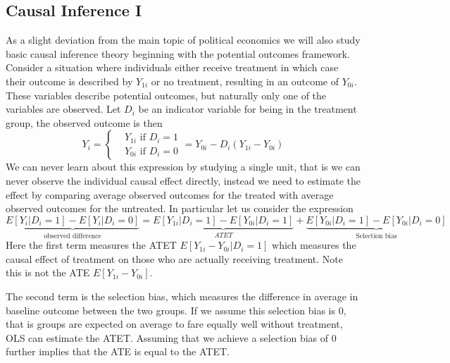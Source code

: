 \subsection{Causal Inference I}
As a slight deviation from the main topic of political economics we will also study basic causal inference theory beginning with the potential outcomes framework. Consider a situation where individuals either receive treatment in which case their outcome is described by $Y_{1i}$ or no treatment, resulting in an outcome of $Y_{0i}$. These variables describe potential outcomes, but naturally only one of the variables are observed. Let $D_i$ be an indicator variable for being in the treatment group, the observed outcome is then 
\begin{equation}
    Y_i = \begin{cases}
        &Y_{1i}  \text{ if } D_i = 1 \\
        &Y_{0i}  \text{ if } D_i = 0
    \end{cases}
    = Y_{0i} - D_i (Y_{1i} - Y_{0i}) 
\end{equation}
We can never learn about this expression by studying a single unit, that is we can never observe the individual causal effect directly, instead we need to estimate the effect by comparing average observed outcomes for the treated with average observed outcomes for the untreated. In particular let us consider the expression 
\begin{equation}
    \underbrace{E[Y_i|D_i = 1] - E[Y_i|D_i = 0]}_{\text{observed difference}} = 
    \underbrace{E[Y_{1i}|D_i = 1] - E[Y_{0i}|D_i = 1]}_{ATET} +
    \underbrace{E[Y_{0i}|D_i=1] -E[Y_{0i}|D_i = 0]}_{\text{Selection bias}}
\end{equation}
Here the first term measures the ATET $E[Y_{1i} - Y_{0i}|D_i = 1]$ which measures the causal effect of treatment on those who are actually receiving treatment. Note this is not the ATE $E[Y_{1i} - Y_{0i}]$. 

The second term is the selection bias, which measures the difference in average in baseline outcome between the two groups. If we assume this selection bias is 0, that is groups are expected on average to fare equally well without treatment, OLS can estimate the ATET. Assuming that we achieve a selection bias of 0 further implies that the ATE is equal to the ATET.
